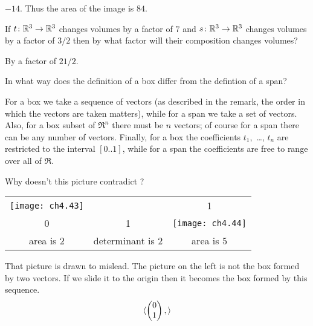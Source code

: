 \begin{exercises}
\begin{answer}
      \( -14 \).
      Thus the area of the image is \( 84 \).  
    \end{answer}
  \item
     If \( \mbox{$t\colon \mathbb{R}^3\to \mathbb{R}^3$} \) changes volumes by a factor of \( 7 \)
     and \( \mbox{$s\colon \mathbb{R}^3\to \mathbb{R}^3$} \) changes volumes by a factor of \( 3/2 \)
     then by what factor will their composition changes volumes?
     \begin{answer}
        By a factor of \( 21/2 \).
     \end{answer}
  \item 
    In what way does the definition of a box differ from the
    defintion of a span?
    \begin{answer}
      For a box we take a sequence of vectors (as described
      in the remark, the order in which the vectors are taken matters),
      while for a span we take a set of vectors.
      Also, for a box subset of $\Re^n$ there must be $n$ vectors; 
      of course for a span there can be any number of vectors.
      Finally, for a box the coefficients $t_1$,~\ldots, $t_n$
      are restricted to the interval $[0..1]$, while for a 
      span the coefficients are free to range over all of $\Re$. 
    \end{answer}
  \recommended \item 
    Why doesn't this picture contradict
    ?
    \begin{center}
      \begin{tabular}{ccc}
        \texttt{[image: ch4.43]}
        &\raisebox{12pt}{\( \grstep{\bigl(\begin{smallmatrix}
                                        2  &1 \\
                                        0  &1
                                     \end{smallmatrix}\bigr)} \)}
        &\texttt{[image: ch4.44]}                                 \\
        area is $2$
        &determinant is $2$
        &area is $5$
      \end{tabular}
    \end{center}
    \begin{answer}
      That picture is drawn to mislead.
      The picture on the left is not the box formed by two vectors.
      If we slide it to the origin then it becomes the box formed by
      this sequence.
      \begin{equation*}
        \langle
          \begin{pmatrix} 0 \\ 1 \end{pmatrix},
\rangle
\end{equation*}
\end{answer}
\end{exercises}
